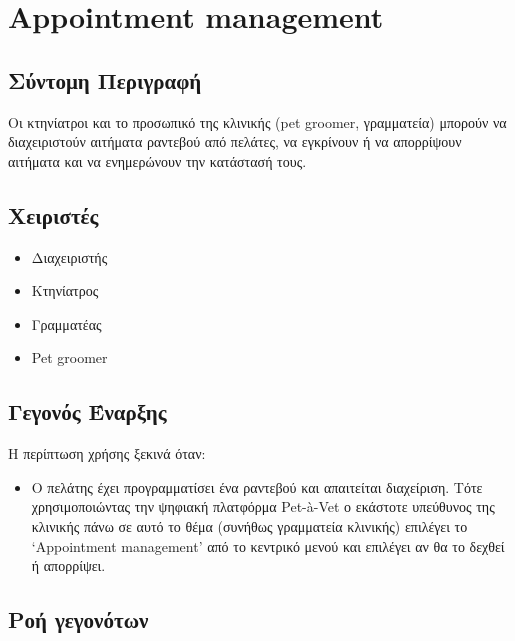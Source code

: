 \documentclass[12pt,a4paper,twoside]{book}
\begin{document}
\section{Appointment management}

\subsection{Σύντομη Περιγραφή}
Οι κτηνίατροι και το προσωπικό της κλινικής (pet groomer, γραμματεία) μπορούν να διαχειριστούν αιτήματα ραντεβού από πελάτες, να εγκρίνουν ή να απορρίψουν αιτήματα και να ενημερώνουν την κατάστασή τους. %

\subsection{Χειριστές}
\begin{itemize}
  \item Διαχειριστής
  \item Κτηνίατρος
  \item Γραμματέας
  \item Pet groomer
\end{itemize}

\subsection{Γεγονός Έναρξης}
Η περίπτωση χρήσης ξεκινά όταν:
\begin{itemize}
  \item Ο πελάτης έχει προγραμματίσει ένα ραντεβού και απαιτείται διαχείριση. Τότε χρησιμοποιώντας την ψηφιακή πλατφόρμα  Pet-à-Vet ο εκάστοτε υπεύθυνος της κλινικής πάνω σε αυτό το θέμα (συνήθως γραμματεία κλινικής) επιλέγει το ‘Appointment management’ από το κεντρικό μενού και επιλέγει αν θα το δεχθεί ή απορρίψει. %
\end{itemize}

\subsection{Ροή γεγονότων}
\end{document}

